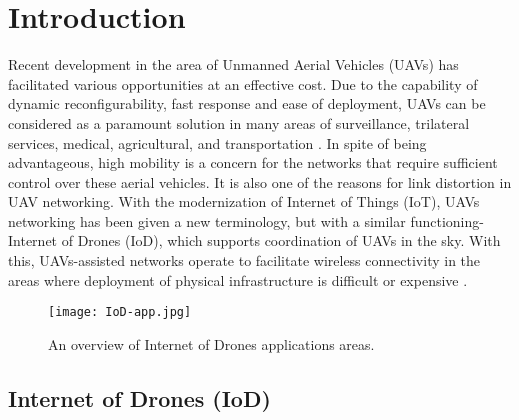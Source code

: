 \documentclass{easychair}
\begin{document}
\section{Introduction}
\label{sect:introduction}
Recent development in the area of Unmanned Aerial Vehicles (UAVs) has facilitated various opportunities at an effective cost. Due to the capability of dynamic reconfigurability, fast response and ease of deployment, UAVs can be considered as a paramount solution in many areas of surveillance, trilateral services, medical, agricultural, and transportation \cite{pajares2015overview} \cite{liu2014review}. In spite of being advantageous, high mobility is a concern for the networks that require sufficient control over these aerial vehicles. It is also one of the reasons for link distortion in UAV networking. With the modernization of Internet of Things (IoT), UAVs networking has been given a new terminology, but with a similar functioning- Internet of Drones (IoD), which supports coordination of UAVs in the sky. With this, UAVs-assisted networks operate to facilitate wireless connectivity in the areas where deployment of physical infrastructure is difficult or expensive \cite{sharma2018self}.

\begin{figure}[ht!]
\centering
\texttt{[image: IoD-app.jpg]}
\caption{An overview of Internet of Drones applications areas.}
\label{IoD_app}
\end{figure}
\subsection{Internet of Drones (IoD)}
\label{sect:IoD}
\end{document}
